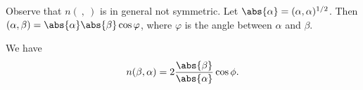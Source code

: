 Observe that $n(\ ,\ )$ is in general not symmetric. Let $\abs{\alpha} = (\alpha, \alpha)^{1/2}$.
Then $(\alpha, \beta) = \abs{\alpha}\abs{\beta}\cos\varphi$, where $\varphi$ is the
angle between $\alpha$ and $\beta$.

We have
\[ n(\beta, \alpha) = 2\frac{\abs{\beta}}{\abs{\alpha}}\cos\phi. \]
